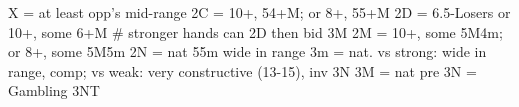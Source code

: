 X = at least opp's mid-range
2C = 10+, 54+M; or 8+, 55+M
2D = 6.5-Losers or 10+, some 6+M  # stronger hands can 2D then bid 3M
2M = 10+, some 5M4m; or 8+, some 5M5m
2N = nat 55m wide in range
3m = nat. vs strong: wide in range, comp; vs weak: very constructive (13-15), inv 3N
3M = nat pre
3N = Gambling 3NT